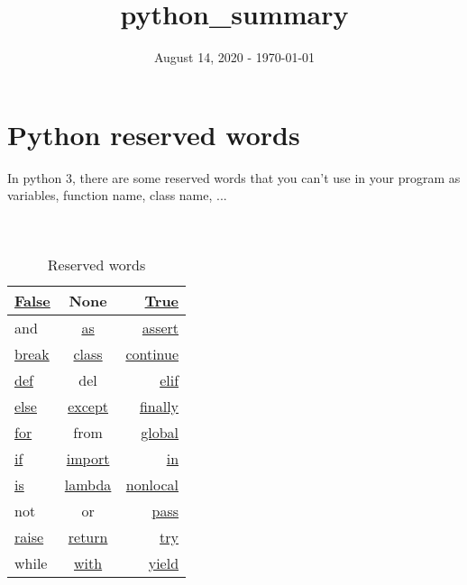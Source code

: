\documentclass[a4paper, 12pt, titlepage]{scrartcl} %
\title{python\_summary}
\author{}
\date{August 14, 2020 - \today}
\begin{document}
\maketitle
\newpage

\tableofcontents

\newpage
\section{Python reserved words}
In python 3, there are some reserved words that you can't use in your program as variables, function name, class name, ... \\ \\ \\

\begin{table}[h]
\begin{center}
{\renewcommand{\arraystretch}{2} %
{\setlength{\tabcolsep}{1.5cm} %
\begin{tabular}{|l|c|r|}
  \hline
  \hyperref[subsec:Bool]{False} & None & \hyperref[subsec:Bool]{True} \\
  \hline
  and & \hyperref[As]{as} & \hyperref[subsec:Assertion]{assert} \\
  \hline
  \hyperref[subsec:BCPR]{break} & \hyperref[sec:Class]{class} & \hyperref[subsec:BCPR]{continue} \\
  \hline
  \hyperref[sec:Function]{def} & del & \hyperref[IEE]{elif} \\
  \hline
  \hyperref[IEE]{else} & \hyperref[TEEF]{except} & \hyperref[TEEF]{finally} \\
  \hline
  \hyperref[subsec:For]{for} & from & \hyperref[subsec:Global/Nonlocal]{global} \\
  \hline
  \hyperref[IEE]{if} & \hyperref[subsec:Import]{import} & \hyperref[Comprehension]{in} \\
  \hline
  \hyperref[subsec:Is]{is} & \hyperref[subsec:Lambda]{lambda} & \hyperref[subsec:Global/Nonlocal]{nonlocal} \\
  \hline 
  not & or & \hyperref[subsec:BCPR]{pass} \\
  \hline 
  \hyperref[Raise]{raise} & \hyperref[subsec:BCPR]{return} & \hyperref[TEEF]{try} \\
  \hline
  while & \hyperref[subsec:ContextManager]{with} & \hyperref[sec:Generators]{yield} \\
  \hline
\end{tabular}}}
\end{center}
\caption{Reserved words}
\end{table}
\end{document}
